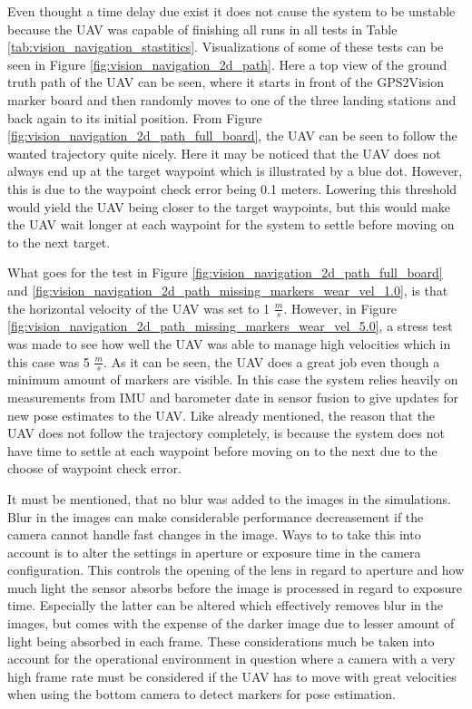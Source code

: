 \documentclass[../Head/report.tex]{subfiles}
\begin{document}
Even thought a time delay due exist it does not cause the system to be unstable because the UAV was capable of finishing all runs in all tests in Table \ref{tab:vision_navigation_stastitics}. Visualizations of some of these tests can be seen in Figure \ref{fig:vision_navigation_2d_path}. Here a top view of the ground truth path of the UAV can be seen, where it starts in front of the GPS2Vision marker board and then randomly moves to one of the three landing stations and back again to its initial position. From Figure \ref{fig:vision_navigation_2d_path_full_board}, the UAV can be seen to follow the wanted trajectory quite nicely. Here it may be noticed that the UAV does not always end up at the target waypoint which is illustrated by a blue dot. However, this is due to the waypoint check error being 0.1 meters. Lowering this threshold would yield the UAV being closer to the target waypoints, but this would make the UAV wait longer at each waypoint for the system to settle before moving on to the next target. 

What goes for the test in Figure \ref{fig:vision_navigation_2d_path_full_board} and \ref{fig:vision_navigation_2d_path_missing_markers_wear_vel_1.0}, is that the horizontal velocity of the UAV was set to 1 $\frac{m}{s}$. However, in Figure \ref{fig:vision_navigation_2d_path_missing_markers_wear_vel_5.0}, a stress test was made to see how well the UAV was able to manage high velocities which in this case was 5 $\frac{m}{s}$. As it can be seen, the UAV does a great job even though a minimum amount of markers are visible. In this case the system relies heavily on measurements from IMU and barometer date in sensor fusion to give updates for new pose estimates to the UAV. Like already mentioned, the reason that the UAV does not follow the trajectory completely, is because the system does not have time to settle at each waypoint before moving on to the next due to the choose of waypoint check error. 

It must be mentioned, that no blur was added to the images in the simulations. Blur in the images can make considerable performance decreasement if the camera cannot handle fast changes in the image. Ways to to take this into account is to alter the settings in aperture or exposure time in the camera configuration. This controls the opening of the lens in regard to aperture and how much light the sensor absorbs before the image is processed in regard to exposure time. Especially the latter can be altered which effectively removes blur in the images, but comes with the expense of the darker image due to lesser amount of light being absorbed in each frame. These considerations much be taken into account for the operational environment in question where a camera with a very high frame rate must be considered if the UAV has to move with great velocities when using the bottom camera to detect markers for pose estimation. 
\end{document}

